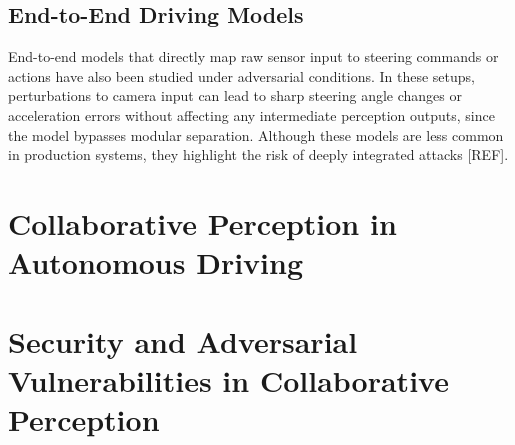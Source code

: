 \subsection{End-to-End Driving Models}
End-to-end models that directly map raw sensor input to steering commands or actions have also been studied under adversarial conditions. 
In these setups, perturbations to camera input can lead to sharp steering angle changes or acceleration errors without affecting any intermediate perception outputs, since the model bypasses modular separation. 
Although these models are less common in production systems, they highlight the risk of deeply integrated attacks [REF].

\section{Collaborative Perception in Autonomous Driving}


\section{Security and Adversarial Vulnerabilities in Collaborative Perception}

